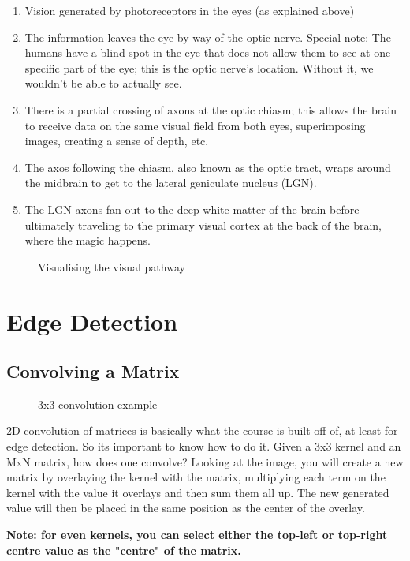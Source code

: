 \begin{enumerate}
	\item Vision generated by photoreceptors in the eyes (as explained above)
	\item The information leaves the eye by way of the optic nerve. Special note: The humans have a blind spot in the eye that does not allow them to see at one specific part of the eye; this is the optic nerve's location. Without it, we wouldn't be able to actually see.
	\item There is a partial crossing of axons at the optic chiasm; this allows the brain to receive data on the same visual field from both eyes, superimposing images, creating a sense of depth, etc.
	\item The axos following the chiasm, also known as the optic tract, wraps around the midbrain to get to the lateral geniculate nucleus (LGN).
	\item The LGN axons fan out to the deep white matter of the brain before ultimately traveling to the primary visual cortex at the back of the brain, where the magic happens.
\end{enumerate}
\begin{figure}[!htb]
	\caption{\label{fig:lens} Visualising the visual pathway}
\end{figure}

\section{Edge Detection}
\subsection{Convolving a Matrix}
\begin{figure}[!htb]
	\caption{\label{fig:convolve} 3x3 convolution example}
\end{figure}
2D convolution of matrices is basically what the course is built off of, at least for edge detection. So its important to know how to do it. Given a 3x3 kernel and an MxN matrix, how does one convolve? Looking at the image, you will create a new matrix by overlaying the kernel with the matrix, multiplying each term on the kernel with the value it overlays and then sum them all up. The new generated value will then be placed in the same position as the center of the overlay. 

\textbf{Note: for even kernels, you can select either the top-left or top-right centre value as the "centre" of the matrix.}

